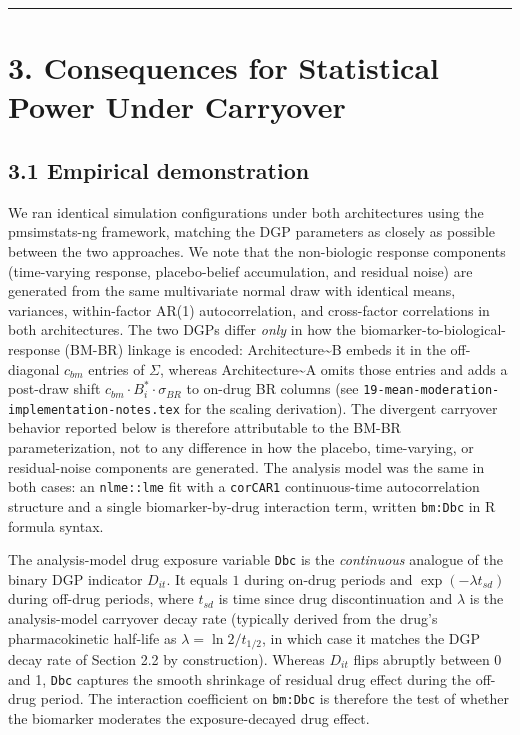 \documentclass[
  11pt,
]{article}
\begin{document}
\bigskip\noindent

\rule{\textwidth}{0.4pt}\bigskip

\section{3. Consequences for Statistical Power Under Carryover}

\subsection{3.1 Empirical demonstration}

We ran identical simulation configurations under both architectures
using the pmsimstats-ng framework, matching the DGP parameters as
closely as possible between the two approaches. We note that the
non-biologic response components (time-varying response, placebo-belief
accumulation, and residual noise) are generated from the same
multivariate normal draw with identical means, variances, within-factor
AR(1) autocorrelation, and cross-factor correlations in both
architectures. The two DGPs differ \emph{only} in how the
biomarker-to-biological-response (BM-BR) linkage is encoded:
Architecture\textasciitilde B embeds it in the off-diagonal \(c_{bm}\)
entries of \(\Sigma\), whereas Architecture\textasciitilde A omits those
entries and adds a post-draw shift
\(c_{bm} \cdot B_i^{*} \cdot \sigma_{BR}\) to on-drug BR columns (see
\texttt{19-mean-moderation-implementation-notes.tex} for the scaling
derivation). The divergent carryover behavior reported below is
therefore attributable to the BM-BR parameterization, not to any
difference in how the placebo, time-varying, or residual-noise
components are generated. The analysis model was the same in both cases:
an \texttt{nlme::lme} fit with a \texttt{corCAR1} continuous-time
autocorrelation structure and a single biomarker-by-drug interaction
term, written \texttt{bm:Dbc} in R formula syntax.

The analysis-model drug exposure variable \texttt{Dbc} is the
\emph{continuous} analogue of the binary DGP indicator \(D_{it}\). It
equals \(1\) during on-drug periods and \(\exp(-\lambda t_{sd})\) during
off-drug periods, where \(t_{sd}\) is time since drug discontinuation
and \(\lambda\) is the analysis-model carryover decay rate (typically
derived from the drug's pharmacokinetic half-life as
\(\lambda = \ln 2 / t_{1/2}\), in which case it matches the DGP decay
rate of Section 2.2 by construction). Whereas \(D_{it}\) flips abruptly
between 0 and 1, \texttt{Dbc} captures the smooth shrinkage of residual
drug effect during the off-drug period. The interaction coefficient on
\texttt{bm:Dbc} is therefore the test of whether the biomarker moderates
the exposure-decayed drug effect.
\end{document}
